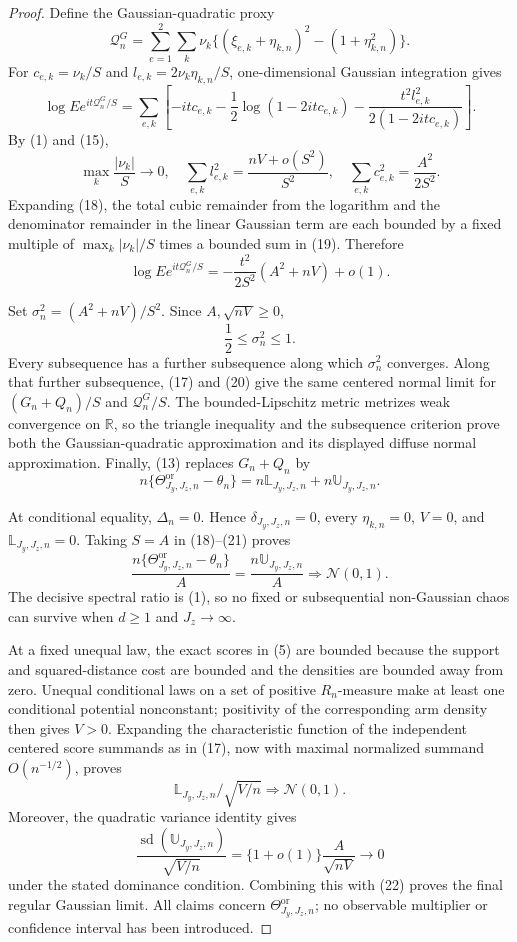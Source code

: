 \documentclass{article}
\begin{document}
\begin{proof}
Define the Gaussian-quadratic proxy
\[
\mathcal Q_n^G=\sum_{e=1}^2\sum_k\nu_k
\{(\xi_{e,k}+\eta_{k,n})^2-(1+\eta_{k,n}^2)\}.
\]
For \(c_{e,k}=\nu_k/S\) and \(l_{e,k}=2\nu_k\eta_{k,n}/S\), one-dimensional Gaussian integration gives
\[
\log Ee^{it\mathcal Q_n^G/S}
=\sum_{e,k}\left[-itc_{e,k}-\frac12\log(1-2itc_{e,k})
-\frac{t^2l_{e,k}^2}{2(1-2itc_{e,k})}\right]. \tag{18}
\]
By (1) and (15),
\[
\max_k\frac{|\nu_k|}{S}\to0,
\quad
\sum_{e,k}l_{e,k}^2=\frac{nV+o(S^2)}{S^2},
\quad
\sum_{e,k}c_{e,k}^2=\frac{A^2}{2S^2}. \tag{19}
\]
Expanding (18), the total cubic remainder from the logarithm and the denominator remainder in the linear Gaussian term are each bounded by a fixed multiple of \(\max_k|\nu_k|/S\) times a bounded sum in (19). Therefore
\[
\log Ee^{it\mathcal Q_n^G/S}
=-\frac{t^2}{2S^2}(A^2+nV)+o(1). \tag{20}
\]

Set \(\sigma_n^2=(A^2+nV)/S^2\). Since \(A,\sqrt{nV}\ge0\),
\[
\frac12\le\sigma_n^2\le1. \tag{21}
\]
Every subsequence has a further subsequence along which \(\sigma_n^2\) converges. Along that further subsequence, (17) and (20) give the same centered normal limit for \((G_n+Q_n)/S\) and \(\mathcal Q_n^G/S\). The bounded-Lipschitz metric metrizes weak convergence on \(\mathbb R\), so the triangle inequality and the subsequence criterion prove both the Gaussian-quadratic approximation and its displayed diffuse normal approximation. Finally, (13) replaces \(G_n+Q_n\) by
\[
n\{\Theta^{\mathrm{or}}_{J_y,J_z,n}-\theta_n\}
=n\mathbb L_{J_y,J_z,n}+n\mathbb U_{J_y,J_z,n}. \tag{22}
\]

At conditional equality, \(\Delta_n=0\). Hence \(\delta_{J_y,J_z,n}=0\), every \(\eta_{k,n}=0\), \(V=0\), and \(\mathbb L_{J_y,J_z,n}=0\). Taking \(S=A\) in (18)--(21) proves
\[
\frac{n\{\Theta^{\mathrm{or}}_{J_y,J_z,n}-\theta_n\}}{A}
=\frac{n\mathbb U_{J_y,J_z,n}}{A}\Rightarrow\mathcal N(0,1).
\]
The decisive spectral ratio is (1), so no fixed or subsequential non-Gaussian chaos can survive when \(d\ge1\) and \(J_z\to\infty\).

At a fixed unequal law, the exact scores in (5) are bounded because the support and squared-distance cost are bounded and the densities are bounded away from zero. Unequal conditional laws on a set of positive \(R_n\)-measure make at least one conditional potential nonconstant; positivity of the corresponding arm density then gives \(V>0\). Expanding the characteristic function of the independent centered score summands as in (17), now with maximal normalized summand \(O(n^{-1/2})\), proves
\[
\mathbb L_{J_y,J_z,n}/\sqrt{V/n}\Rightarrow\mathcal N(0,1).
\]
Moreover, the quadratic variance identity gives
\[
\frac{\operatorname{sd}(\mathbb U_{J_y,J_z,n})}{\sqrt{V/n}}
=\{1+o(1)\}\frac{A}{\sqrt{nV}}\longrightarrow0
\]
under the stated dominance condition. Combining this with (22) proves the final regular Gaussian limit. All claims concern \(\Theta^{\mathrm{or}}_{J_y,J_z,n}\); no observable multiplier or confidence interval has been introduced.
\end{proof}
\end{document}
